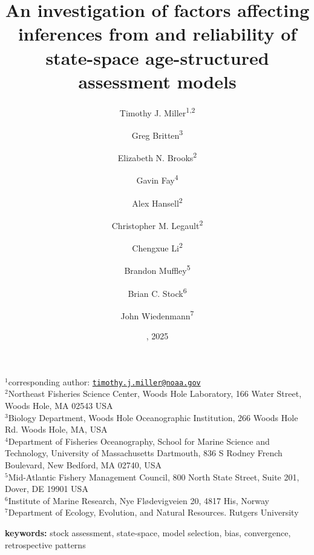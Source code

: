\documentclass[
  12pt,
]{article}
\title{An investigation of factors affecting inferences from and
reliability of state-space age-structured assessment models}
\author{Timothy J. Miller\textsuperscript{1,2} \and Greg
Britten\textsuperscript{3} \and Elizabeth N.
Brooks\textsuperscript{2} \and Gavin Fay\textsuperscript{4} \and Alex
Hansell\textsuperscript{2} \and Christopher M.
Legault\textsuperscript{2} \and Chengxue
Li\textsuperscript{2} \and Brandon Muffley\textsuperscript{5} \and Brian
C. Stock\textsuperscript{6} \and John Wiedenmann\textsuperscript{7}}
\date{\DIFdelbegin \DIFdel{02 May}\DIFdelend \DIFaddbegin \DIFadd{29 September}\DIFaddend , 2025}
\providecommand{\DIFadd}[1]{{\protect\color{blue}\uwave{#1}}} %
\providecommand{\DIFaddbegin}{} %
\providecommand{\DIFaddend}{} %
\providecommand{\DIFdelbegin}{} %
\providecommand{\DIFdelend}{} %
\newcommand{\DIFscaledelfig}{0.5}
\newlength{\DIFdelgraphicswidth} %
\newlength{\DIFdelgraphicsheight} %
\newcommand{\DIFaddincludegraphics}[2][]{{\color{blue}\fbox{\DIFOincludegraphics[#1]{#2}}}} %
\newcommand{\DIFdelincludegraphics}[2][]{%
\sbox{\DIFdelgraphicsbox}{\DIFOincludegraphics[#1]{#2}}%
\settoboxwidth{\DIFdelgraphicswidth}{\DIFdelgraphicsbox} %
\settoboxtotalheight{\DIFdelgraphicsheight}{\DIFdelgraphicsbox} %
\scalebox{\DIFscaledelfig}{%
\parbox[b]{\DIFdelgraphicswidth}{\usebox{\DIFdelgraphicsbox}\\[-\baselineskip] \rule{\DIFdelgraphicswidth}{0em}}\llap{\resizebox{\DIFdelgraphicswidth}{\DIFdelgraphicsheight}{%
\setlength{\unitlength}{\DIFdelgraphicswidth}%
\begin{picture}(1,1)%
\thicklines\linethickness{2pt} %
{\color[rgb]{1,0,0}\put(0,0){\framebox(1,1){}}}%
{\color[rgb]{1,0,0}\put(0,0){\line( 1,1){1}}}%
{\color[rgb]{1,0,0}\put(0,1){\line(1,-1){1}}}%
\end{picture}%
}\hspace*{3pt}}} %
} %
\DeclareRobustCommand{\DIFaddbegin}{\DIFOaddbegin \let\includegraphics\DIFaddincludegraphics} %
\DeclareRobustCommand{\DIFaddend}{\DIFOaddend \let\includegraphics\DIFOincludegraphics} %
\DeclareRobustCommand{\DIFdelbegin}{\DIFOdelbegin \let\includegraphics\DIFdelincludegraphics} %
\DeclareRobustCommand{\DIFdelend}{\DIFOaddend \let\includegraphics\DIFOincludegraphics} %
\begin{document}
\maketitle

\(^1\)corresponding author:
\href{mailto:timothy.j.miller@noaa.gov}{\nolinkurl{timothy.j.miller@noaa.gov}}\\
\(^2\)Northeast Fisheries Science Center, Woods Hole Laboratory, 166
Water Street, Woods Hole, MA 02543 USA\\
\(^3\)Biology Department, Woods Hole Oceanographic Institution, 266
Woods Hole Rd. Woods Hole, MA, USA\\
\(^4\)Department of Fisheries Oceanography, School for Marine Science
and Technology, University of Massachusetts Dartmouth, 836 S Rodney
French Boulevard, New Bedford, MA 02740, USA\\
\(^5\)Mid-Atlantic Fishery Management Council, 800 North State Street,
Suite 201, Dover, DE 19901 USA\\
\(^6\)Institute of Marine Research, Nye Flødevigveien 20, 4817 His,
Norway\\
\(^7\)Department of Ecology, Evolution, and Natural Resources. Rutgers
University\\

\pagebreak

\textbf{keywords:} stock assessment, state-space, model selection, bias,
convergence, retrospective patterns

\DIFdelbegin %
\DIFdelend \DIFaddbegin \subsection*{\DIFadd{Abstract}}\label{abstract}
\DIFaddend {}
\end{document}
